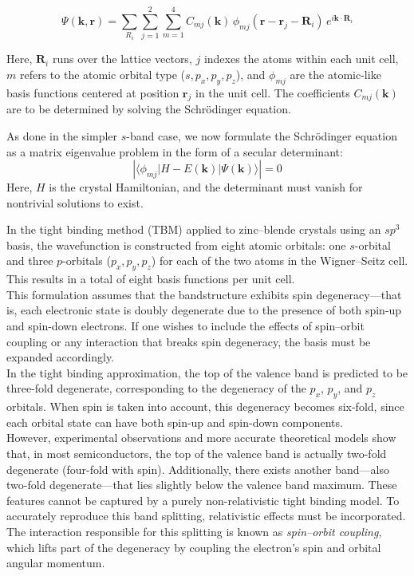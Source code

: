 \begin{equation}
	\Psi(\mathbf{k}, \mathbf{r}) = \sum_{R_i} \sum_{j=1}^{2} \sum_{m=1}^{4} C_{mj}(\mathbf{k}) \, \phi_{mj}(\mathbf{r} - \mathbf{r}_j - \mathbf{R}_i) \, e^{i\mathbf{k} \cdot \mathbf{R}_i}
\end{equation}

\noindent
Here, \( \mathbf{R}_i \) runs over the lattice vectors, \( j \) indexes the atoms within each unit cell, \( m \) refers to the atomic orbital type (\( s, p_x, p_y, p_z \)), and \( \phi_{mj} \) are the atomic-like basis functions centered at position \( \mathbf{r}_j \) in the unit cell. The coefficients \( C_{mj}(\mathbf{k}) \) are to be determined by solving the Schrödinger equation.

As done in the simpler \( s \)-band case, we now formulate the Schrödinger equation as a matrix eigenvalue problem in the form of a secular determinant:
\begin{equation}
	\left| \langle \phi_{mj} | H - E(\mathbf{k}) | \Psi(\mathbf{k}) \rangle \right| = 0
\end{equation}
\noindent
Here, \( H \) is the crystal Hamiltonian, and the determinant must vanish for nontrivial solutions to exist.

In the tight binding method (TBM) applied to zinc–blende crystals using an \( sp^3 \) basis, the wavefunction is constructed from eight atomic orbitals: one \( s \)-orbital and three \( p \)-orbitals (\( p_x, p_y, p_z \)) for each of the two atoms in the Wigner–Seitz cell. This results in a total of eight basis functions per unit cell.\\

This formulation assumes that the bandstructure exhibits spin degeneracy—that is, each electronic state is doubly degenerate due to the presence of both spin-up and spin-down electrons. If one wishes to include the effects of spin–orbit coupling or any interaction that breaks spin degeneracy, the basis must be expanded accordingly.\\

In the tight binding approximation, the top of the valence band is predicted to be three-fold degenerate, corresponding to the degeneracy of the \( p_x \), \( p_y \), and \( p_z \) orbitals. When spin is taken into account, this degeneracy becomes six-fold, since each orbital state can have both spin-up and spin-down components.\\

However, experimental observations and more accurate theoretical models show that, in most semiconductors, the top of the valence band is actually two-fold degenerate (four-fold with spin). Additionally, there exists another band—also two-fold degenerate—that lies slightly below the valence band maximum.
These features cannot be captured by a purely non-relativistic tight binding model. To accurately reproduce this band splitting, relativistic effects must be incorporated. The interaction responsible for this splitting is known as \textit{spin–orbit coupling}, which lifts part of the degeneracy by coupling the electron's spin and orbital angular momentum.

